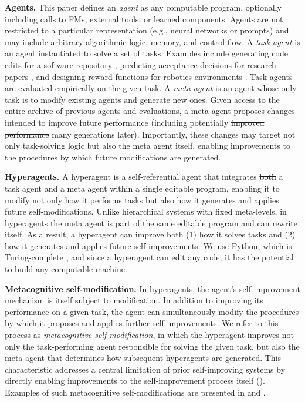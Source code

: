 \documentclass[]{fairmeta}
\providecommand{\DIFdeltex}[1]{{\protect\color{red}\sout{#1}}}                      %
\providecommand{\DIFdelbegin}{} %
\providecommand{\DIFdelend}{} %
\providecommand{\DIFdel}[1]{\texorpdfstring{\DIFdeltex{#1}}{}} %
\begin{document}
\textbf{Agents.} This paper defines an \textit{agent} as any computable program, optionally including calls to FMs, external tools, or learned components. Agents are not restricted to a particular representation (e.g., neural networks or prompts) and may include arbitrary algorithmic logic, memory, and control flow.
A \textit{task agent} is an agent instantiated to solve a set of tasks. Examples include generating code edits for a software repository \citep{gauthier2024polyglot, jimenez2024swebench}, predicting acceptance decisions for research papers \citep{couto2024relevai}, and designing reward functions for robotics environments \citep{maeureka}. Task agents are evaluated empirically on the given task.
A \textit{meta agent} is an agent whose only task is to modify existing agents and generate new ones. Given access to the entire archive of previous agents and evaluations, a meta agent proposes changes intended to improve future performance (including potentially \DIFdelbegin \DIFdel{improved performance }\DIFdelend many generations later). Importantly, these changes may target not only task-solving logic but also the meta agent itself, enabling improvements to the procedures by which future modifications are generated.

\textbf{Hyperagents.} A hyperagent is a self-referential agent that integrates \DIFdelbegin \DIFdel{both }\DIFdelend a task agent and a meta agent within a single editable program, enabling it to modify not only how it performs tasks but also how it generates \DIFdelbegin \DIFdel{and applies }\DIFdelend future self-modifications. Unlike hierarchical systems with fixed meta-levels, in hyperagents the meta agent is part of the same editable program and can rewrite itself. As a result, a hyperagent can improve both (1) how it solves tasks and (2) how it generates \DIFdelbegin \DIFdel{and applies }\DIFdelend future self-improvements. We use Python, which is Turing-complete \citep{turing1936computable}, and since a hyperagent can edit any code, it has the potential to build any computable machine.

\textbf{Metacognitive self-modification.} In hyperagents, the agent's self-improvement mechanism is itself subject to modification. In addition to improving its performance on a given task, the agent can simultaneously modify the procedures by which it proposes and applies further self-improvements. We refer to this process as \textit{metacognitive self-modification}, in which the hyperagent improves not only the task-performing agent responsible for solving the given task, but also the meta agent that determines how subsequent hyperagents are generated. This characteristic addresses a central limitation of prior self-improving systems \citep{zhang2025darwin, wang2025huxley} by directly enabling improvements to the self-improvement process itself (). Examples of such metacognitive self-modifications are presented in  and .
\end{document}
